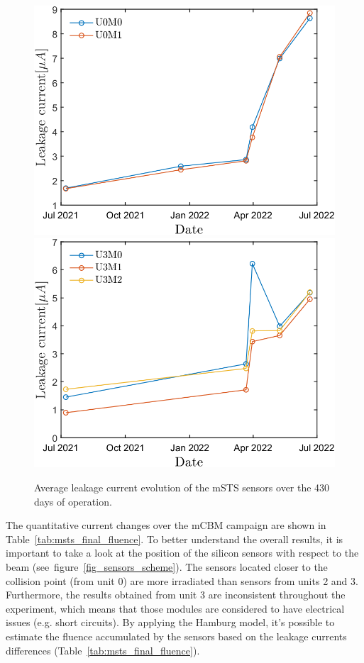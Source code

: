 \begin{figure}[!h]
\centering
\includegraphics[width=0.48\columnwidth]{Chapter6/DCS/images/sensors/U0_leakage.png}
\includegraphics[width=0.48\columnwidth]{Chapter6/DCS/images/sensors/U3_leakage.png}
\caption{Average leakage current evolution of the \gls{mSTS} sensors over the 430 days of operation. }
\label{fig_leak}
\end{figure}

\newpage
The quantitative current changes over the \gls{mCBM} campaign are shown in Table~\ref{tab:msts_final_fluence}. To better understand the overall results, it is important to take a look at the position of the silicon sensors with respect to the beam (see~figure~\ref{fig_sensors_scheme}). The sensors located closer to the collision point (from unit 0) are more irradiated than sensors from units 2 and 3. Furthermore, the results obtained from unit 3 are inconsistent throughout the experiment, which means that those modules are considered to have electrical issues (e.g. short circuits). By applying the Hamburg model, it's possible to estimate the fluence accumulated by the sensors based on the leakage currents differences (Table~\ref{tab:msts_final_fluence}). 

